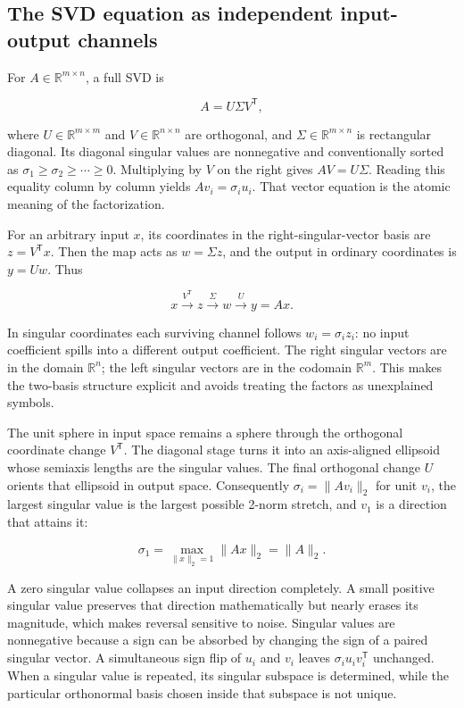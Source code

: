 \subsection{The SVD equation as independent input-output channels}\label{02-foundations-ii-ch024-the-svd-equation-as-independent-input-output-channels}

\hypertarget{02-foundations-ii-ch024-the-svd-equation-as-independent-input-output-channels}{}

For \(A\in\mathbb R^{m\times n}\), a full SVD is

\[
A=U\Sigma V^\mathsf T,
\]

where \(U\in\mathbb R^{m\times m}\) and \(V\in\mathbb R^{n\times n}\) are orthogonal, and \(\Sigma\in\mathbb R^{m\times n}\) is rectangular diagonal. Its diagonal singular values are nonnegative and conventionally sorted as \(\sigma_1\ge\sigma_2\ge\cdots\ge0\). Multiplying by \(V\) on the right gives \(AV=U\Sigma\). Reading this equality column by column yields \(Av_i=\sigma_i u_i\). That vector equation is the atomic meaning of the factorization.

For an arbitrary input \(x\), its coordinates in the right-singular-vector basis are \(z=V^\mathsf T x\). Then the map acts as \(w=\Sigma z\), and the output in ordinary coordinates is \(y=Uw\). Thus

\[
x\xrightarrow{V^\mathsf T}z\xrightarrow{\Sigma}w\xrightarrow{U}y=Ax.
\]

In singular coordinates each surviving channel follows \(w_i=\sigma_i z_i\): no input coefficient spills into a different output coefficient. The right singular vectors are in the domain \(\mathbb R^n\); the left singular vectors are in the codomain \(\mathbb R^m\). This makes the two-basis structure explicit and avoids treating the factors as unexplained symbols.

The unit sphere in input space remains a sphere through the orthogonal coordinate change \(V^\mathsf T\). The diagonal stage turns it into an axis-aligned ellipsoid whose semiaxis lengths are the singular values. The final orthogonal change \(U\) orients that ellipsoid in output space. Consequently \(\sigma_i=\|Av_i\|_2\) for unit \(v_i\), the largest singular value is the largest possible 2-norm stretch, and \(v_1\) is a direction that attains it:

\[
\sigma_1=\max_{\|x\|_2=1}\|Ax\|_2=\|A\|_2.
\]

A zero singular value collapses an input direction completely. A small positive singular value preserves that direction mathematically but nearly erases its magnitude, which makes reversal sensitive to noise. Singular values are nonnegative because a sign can be absorbed by changing the sign of a paired singular vector. A simultaneous sign flip of \(u_i\) and \(v_i\) leaves \(\sigma_i u_i v_i^\mathsf T\) unchanged. When a singular value is repeated, its singular subspace is determined, while the particular orthonormal basis chosen inside that subspace is not unique.

